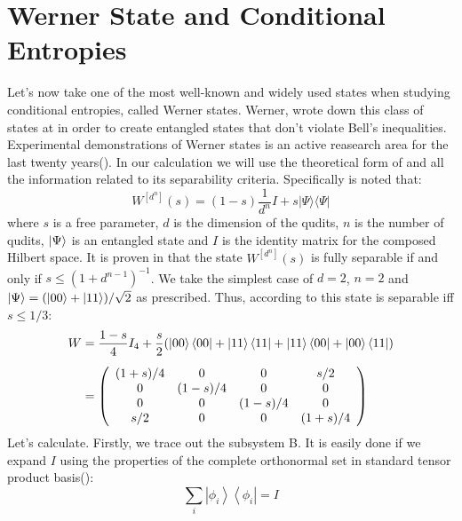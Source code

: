 \section{Werner State and Conditional Entropies}
Let's now take one of the most well-known and widely used states when studying conditional entropies, called Werner states. Werner, wrote down this class of states at \cite{werner1989quantum} in order to create entangled states that don't violate Bell's inequalities. Experimental demonstrations of Werner states is an active reasearch area for the last twenty years(\cite{zhang2002experimental}\cite{cinelli2004parametric}).
In our calculation we will use the theoretical form of \cite{pittenger2000note} and all the information related to its separability criteria. Specifically is noted that:
\begin{equation}
W^{\left[d^{n}\right]}(s)=(1-s) \frac{1}{d^{n}} I+s|\Psi\rangle\langle\Psi|
\label{wernerstate}
\end{equation}
where $s$ is a free parameter, $d$ is the dimension of the qudits, $n$ is the number of qudits, $\ket{\Psi}$ is an  entangled state and $I$ is the identity matrix for the composed Hilbert space. It is proven in \cite{pittenger2000note} that the state   $W^{\left[d^{n}\right]}(s)$ is fully separable if and only if $s \leq\left(1+d^{n-1}\right)^{-1}$.
We take the simplest case of $d=2$, $n=2$ and $\ket{\Psi}=(\ket{00}+\ket{11})/\sqrt{2}$ as prescribed. Thus, according to \cite{pittenger2000note} this state is separable iff $s \leq 1/3$:
\begin{align}
W &=\frac{1-s}{4}I_{4}+\frac{s}{2}(\ket{00}\bra{00}+\ket{11}\bra{11}+\ket{11}\bra{00}+\ket{00}\bra{11})\\[0.5em]&=
\left(
\begin{array}{cccc}
 (1+s)/4 & 0 & 0 & s/2 \\
 0 & (1-s)/4 & 0 & 0 \\
 0 & 0 & (1-s)/4 & 0 \\
 s/2 & 0 & 0 & (1+s)/4 \\
\end{array}
\right)
\label{wernerstate}
\end{align}
Let's calculate. Firstly, we trace out the subsystem B. It is easily done if we expand $I$ using the properties of the complete orthonormal set in standard tensor product basis(\cite{ballentine2014quantum}):
\begin{equation*}
\sum_{i}\left|\phi_{i}\right\rangle\left\langle\phi_{i}\right|=I
\end{equation*}
